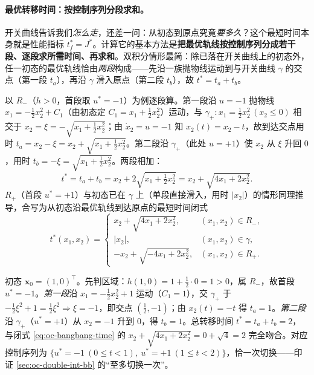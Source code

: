 \paragraph{最优转移时间：按控制序列分段求和。}
开关曲线告诉我们\emph{怎么走}，还差一问：从初态到原点究竟\emph{要多久}？这个最短时间本身就是性能指标 $t_f^*=J^*$。计算它的基本方法是\textbf{把最优轨线按控制序列分成若干段、逐段求所需时间、再求和}\cite{liubao2006modern}。双积分情形最简：除已落在开关曲线上的初态外，任一初态的最优轨线恰由\emph{两段}构成——先沿一族抛物线运动到与开关曲线 $\gamma$ 的交点（第一段 $t_a$），再沿 $\gamma$ 滑入原点（第二段 $t_b$），故 $t^*=t_a+t_b$。

以 $R_-$（$h>0$，首段取 $u^*=-1$）为例逐段算。第一段沿 $u=-1$ 抛物线 $x_1=-\tfrac12x_2^2+C_1$（由初态定 $C_1=x_1+\tfrac12x_2^2$）运动，与 $\gamma_+:x_1=\tfrac12x_2^2\,(x_2\le0)$ 相交于 $x_2=\xi=-\sqrt{x_1+\tfrac12x_2^2}$；由 $\dot x_2=u=-1$ 知 $x_2(t)=x_2-t$，故到达交点用时 $t_a=x_2-\xi=x_2+\sqrt{x_1+\tfrac12x_2^2}$。第二段沿 $\gamma_+$（此处 $u=+1$）使 $x_2$ 从 $\xi$ 升回 $0$，用时 $t_b=-\xi=\sqrt{x_1+\tfrac12x_2^2}$。两段相加：
\begin{equation}
  t^*=t_a+t_b=x_2+2\sqrt{x_1+\tfrac12x_2^2}=x_2+\sqrt{4x_1+2x_2^2}.
  \label{eq:oc-bangbang-time-derive}
\end{equation}
$R_+$（首段 $u^*=+1$）与初态已在 $\gamma$ 上（单段直接滑入，用时 $|x_2|$）的情形同理推导，合写为从初态沿最优轨线到达原点的最短时间闭式
\begin{equation}
  t^*(x_1,x_2)=\begin{cases}x_2+\sqrt{4x_1+2x_2^2},&(x_1,x_2)\in R_-,\\|x_2|,&(x_1,x_2)\in\gamma,\\-x_2+\sqrt{-4x_1+2x_2^2},&(x_1,x_2)\in R_+.\end{cases}
  \label{eq:oc-bangbang-time}
\end{equation}

\begin{example}\label{ex:oc-bangbang-time}
初态 $\mathbf x_0=(1,0)^\top$。先判区域：$h(1,0)=1+\tfrac12\cdot0=1>0$，属 $R_-$，故首段 $u^*=-1$。\emph{第一段}沿 $x_1=-\tfrac12x_2^2+1$ 运动（$C_1=1$），交 $\gamma_+$ 于 $-\tfrac12\xi^2+1=\tfrac12\xi^2\Rightarrow\xi=-1$，即交点 $(\tfrac12,-1)$；由 $x_2(t)=-t$ 得 $t_a=1$。\emph{第二段}沿 $\gamma_+$（$u^*=+1$）从 $x_2=-1$ 升到 $0$，得 $t_b=1$。总转移时间 $t^*=t_a+t_b=2$，与闭式 \cref{eq:oc-bangbang-time} 的 $x_2+\sqrt{4x_1+2x_2^2}=0+\sqrt4=2$ 完全吻合。对应控制序列为 $\{u^*=-1\ (0\le t<1),\ u^*=+1\ (1\le t<2)\}$，恰一次切换——印证 \cref{sec:oc-double-int-bb} 的“至多切换一次”。
\end{example}


